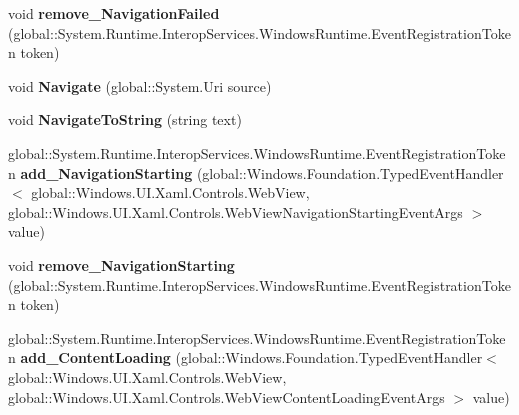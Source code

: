 \begin{DoxyCompactItemize}
void {\bfseries remove\+\_\+\+Navigation\+Failed} (global\+::\+System.\+Runtime.\+Interop\+Services.\+Windows\+Runtime.\+Event\+Registration\+Token token)
\item 
\mbox{\label{class_windows_1_1_u_i_1_1_xaml_1_1_controls_1_1_web_view_afeb9191cdf8b05104415b2eea3c4a61e}} 
void {\bfseries Navigate} (global\+::\+System.\+Uri source)
\item 
\mbox{\label{class_windows_1_1_u_i_1_1_xaml_1_1_controls_1_1_web_view_a499af186643e5dd18801feb99ff90d1b}} 
void {\bfseries Navigate\+To\+String} (string text)
\item 
\mbox{\label{class_windows_1_1_u_i_1_1_xaml_1_1_controls_1_1_web_view_a361ed515c1004df57859facee7c40cff}} 
global\+::\+System.\+Runtime.\+Interop\+Services.\+Windows\+Runtime.\+Event\+Registration\+Token {\bfseries add\+\_\+\+Navigation\+Starting} (global\+::\+Windows.\+Foundation.\+Typed\+Event\+Handler$<$ global\+::\+Windows.\+U\+I.\+Xaml.\+Controls.\+Web\+View, global\+::\+Windows.\+U\+I.\+Xaml.\+Controls.\+Web\+View\+Navigation\+Starting\+Event\+Args $>$ value)
\item 
\mbox{\label{class_windows_1_1_u_i_1_1_xaml_1_1_controls_1_1_web_view_a238be27c68aeec48384e442cecf3b6c0}} 
void {\bfseries remove\+\_\+\+Navigation\+Starting} (global\+::\+System.\+Runtime.\+Interop\+Services.\+Windows\+Runtime.\+Event\+Registration\+Token token)
\item 
\mbox{\label{class_windows_1_1_u_i_1_1_xaml_1_1_controls_1_1_web_view_abafc86e0705f5bfc2a610d4e7db17e58}} 
global\+::\+System.\+Runtime.\+Interop\+Services.\+Windows\+Runtime.\+Event\+Registration\+Token {\bfseries add\+\_\+\+Content\+Loading} (global\+::\+Windows.\+Foundation.\+Typed\+Event\+Handler$<$ global\+::\+Windows.\+U\+I.\+Xaml.\+Controls.\+Web\+View, global\+::\+Windows.\+U\+I.\+Xaml.\+Controls.\+Web\+View\+Content\+Loading\+Event\+Args $>$ value)
\item 
\mbox{\label{class_windows_1_1_u_i_1_1_xaml_1_1_controls_1_1_web_view_a5238a1002352cbd9d9832c39806630dd}} 

\end{DoxyCompactItemize}
